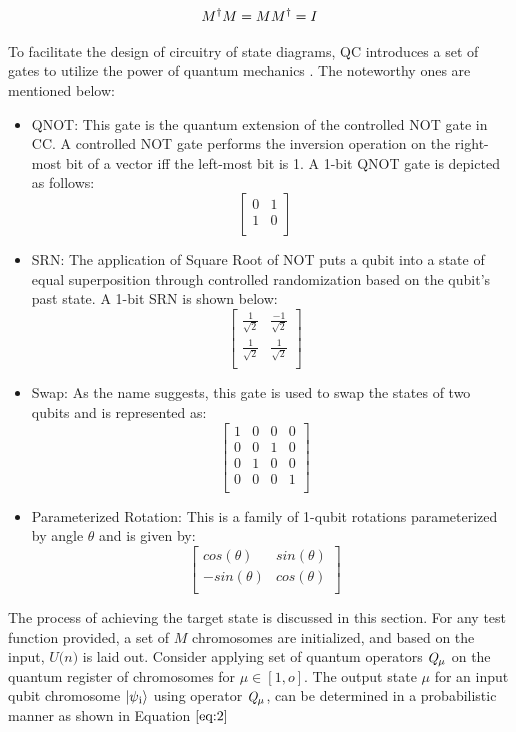 \documentclass[conference]{IEEEtran}
\begin{document}
\begin{equation}
\label{eq:1}
M\textsuperscript{$\dagger$}M = MM\textsuperscript{$\dagger$} = I
\end{equation}


To facilitate the design of circuitry of state diagrams, QC introduces a set of gates to utilize the power of quantum mechanics \cite{qg}. The noteworthy ones are mentioned below:

\begin{itemize}
\item QNOT: This gate is the quantum extension of the controlled NOT gate in CC. A controlled NOT gate performs the inversion operation on the right-most bit of a vector iff the left-most bit is 1. A 1-bit QNOT gate is depicted as follows:
$$
\begin{bmatrix} 
0&1\\
1&0\\
\end{bmatrix}
\quad
$$
\item SRN: The application of Square Root of NOT puts a qubit into a state of equal superposition through controlled randomization based on the qubit's past state. A 1-bit SRN is shown below:
$$
\begin{bmatrix} 
\frac{1}{\sqrt{2}}&\frac{-1}{\sqrt{2}}\\
\frac{1}{\sqrt{2}}&\frac{1}{\sqrt{2}}\\
\end{bmatrix}
\quad
$$
\item Swap: As the name suggests, this gate is used to swap the states of two qubits and is represented as:
$$
\begin{bmatrix} 
{1}&{0}&{0}&{0}\\
{0}&{0}&{1}&{0}\\
{0}&{1}&{0}&{0}\\
{0}&{0}&{0}&{1}\\
\end{bmatrix}
\quad
$$
\item Parameterized Rotation: This is a family of 1-qubit rotations parameterized by angle $\theta$ and is given by:
$$
\begin{bmatrix} 
cos(\theta)&sin(\theta)\\
-sin(\theta)&cos(\theta)\\
\end{bmatrix}
\quad
$$
\end{itemize}

The process of achieving the target state is discussed in this section. For any test function provided, a set of $\textit{M}$ chromosomes are initialized, and based on the input, $\textit{U(n)}$ is laid out. Consider applying set of quantum operators $\textit{Q\textsubscript{$\mu$}}$ on the quantum register of chromosomes for $\mu \in [1,o]$. The output state $\mu$ for an input qubit chromosome $\ket{\psi\textsubscript{i}}$ using operator $\textit{Q\textsubscript{$\mu$}}$, can be determined in a probabilistic manner as shown in Equation $\ref{eq:2}$
\end{document}
